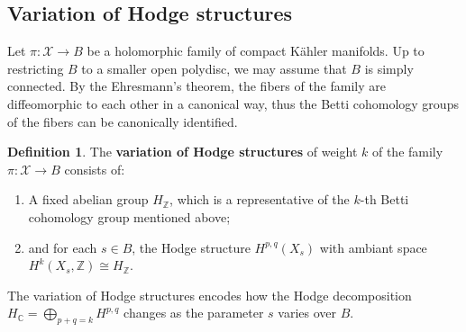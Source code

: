 \documentclass{article}
\newtheorem{theorem}{Theorem}[section]
\theoremstyle{definition}
\newtheorem{definition}[theorem]{Definition}
\newtheorem{remark}[theorem]{Remark}
\begin{document}



 

\subsection{Variation of Hodge structures}\label{SectionVHS}

Let $\pi: \mathcal X\to B$ be a holomorphic family of compact Kähler manifolds. Up to restricting $B$ to a smaller open polydisc, we may assume that $B$ is simply connected. By the Ehresmann's theorem, the fibers of the family are diffeomorphic to each other in a canonical way, thus the Betti cohomology groups of the fibers can be canonically identified. 
\begin{definition}
The \textbf{variation of Hodge structures} of weight \( k \) of the family $\pi: \mathcal X\to B$ consists of:
\begin{enumerate}
    \item A fixed abelian group $H_\mathbb Z$, which is a representative of the $k$-th Betti cohomology group mentioned above;
    \item and for each $s\in B$, the Hodge structure $H^{p, q}(X_s)$ with ambiant space $H^k(X_s, \mathbb Z)\cong H_\mathbb Z$.
\end{enumerate}
\end{definition}

The variation of Hodge structures encodes how the Hodge decomposition \( H_\mathbb{C} = \bigoplus_{p+q=k} H^{p,q} \) changes as the parameter \( s \) varies over \( B \).
\end{document}

